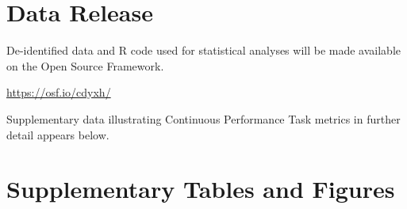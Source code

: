 \documentclass[utf8]{suppmat} %
\begin{document}
\onecolumn
{}

\title[Supplementary Material]{{}}


\maketitle

\section{Data Release}
De-identified data and R code used for statistical analyses will be made available on the Open Source Framework.

\url{https://osf.io/cdyxh/}

Supplementary data illustrating Continuous Performance Task metrics in further detail appears below. 



\section{Supplementary Tables and Figures}


\end{document}
